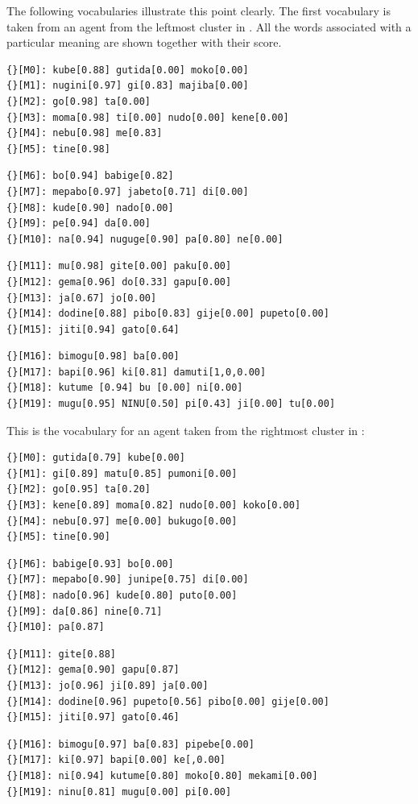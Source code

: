 The following vocabularies illustrate this point clearly.
The first vocabulary is taken from an agent from the
leftmost cluster in . 
All the words associated with a particular meaning are 
shown together with their score.
\begin{verbatim}
{}[M0]: kube[0.88] gutida[0.00] moko[0.00]
{}[M1]: nugini[0.97] gi[0.83] majiba[0.00]
{}[M2]: go[0.98] ta[0.00]
{}[M3]: moma[0.98] ti[0.00] nudo[0.00] kene[0.00]
{}[M4]: nebu[0.98] me[0.83]
{}[M5]: tine[0.98]
\end{verbatim}
\begin{verbatim}
{}[M6]: bo[0.94] babige[0.82]
{}[M7]: mepabo[0.97] jabeto[0.71] di[0.00]
{}[M8]: kude[0.90] nado[0.00]
{}[M9]: pe[0.94] da[0.00]
{}[M10]: na[0.94] nuguge[0.90] pa[0.80] ne[0.00]
\end{verbatim}
\begin{verbatim}
{}[M11]: mu[0.98] gite[0.00] paku[0.00]
{}[M12]: gema[0.96] do[0.33] gapu[0.00]
{}[M13]: ja[0.67] jo[0.00]
{}[M14]: dodine[0.88] pibo[0.83] gije[0.00] pupeto[0.00]
{}[M15]: jiti[0.94] gato[0.64]
\end{verbatim}
\begin{verbatim}
{}[M16]: bimogu[0.98] ba[0.00]
{}[M17]: bapi[0.96] ki[0.81] damuti[1,0,0.00]
{}[M18]: kutume [0.94] bu [0.00] ni[0.00]
{}[M19]: mugu[0.95] NINU[0.50] pi[0.43] ji[0.00] tu[0.00]
\end{verbatim}
This is the vocabulary for an agent taken from the
rightmost cluster in :
\begin{verbatim}
{}[M0]: gutida[0.79] kube[0.00]
{}[M1]: gi[0.89] matu[0.85] pumoni[0.00]
{}[M2]: go[0.95] ta[0.20]
{}[M3]: kene[0.89] moma[0.82] nudo[0.00] koko[0.00]
{}[M4]: nebu[0.97] me[0.00] bukugo[0.00]
{}[M5]: tine[0.90]
\end{verbatim}
\begin{verbatim}
{}[M6]: babige[0.93] bo[0.00]
{}[M7]: mepabo[0.90] junipe[0.75] di[0.00]
{}[M8]: nado[0.96] kude[0.80] puto[0.00]
{}[M9]: da[0.86] nine[0.71]
{}[M10]: pa[0.87]
\end{verbatim}
\begin{verbatim}
{}[M11]: gite[0.88]
{}[M12]: gema[0.90] gapu[0.87]
{}[M13]: jo[0.96] ji[0.89] ja[0.00]
{}[M14]: dodine[0.96] pupeto[0.56] pibo[0.00] gije[0.00]
{}[M15]: jiti[0.97] gato[0.46]
\end{verbatim}
\begin{verbatim}
{}[M16]: bimogu[0.97] ba[0.83] pipebe[0.00]
{}[M17]: ki[0.97] bapi[0.00] ke[,0.00]
{}[M18]: ni[0.94] kutume[0.80] moko[0.80] mekami[0.00]
{}[M19]: ninu[0.81] mugu[0.00] pi[0.00]
\end{verbatim}
